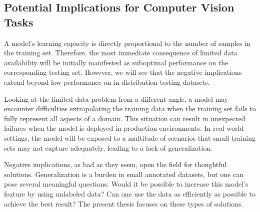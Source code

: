 \subsection{Potential Implications for Computer Vision Tasks}
A model's learning capacity is directly proportional to the number of samples in the training set. Therefore, the most immediate consequence of limited data availability will be initially manifested as suboptimal performance on the corresponding testing set. However, we will see that the negative implications extend beyond low performance on in-distribution testing datasets.

Looking at the limited data problem from a different angle, a model may encounter difficulties extrapolating the training data when the training set fails to fully represent all aspects of a domain. This situation can result in unexpected failures when the model is deployed in production environments. In real-world settings, the model will be exposed to a multitude of scenarios that small training sets may not capture adequately, leading to a lack of generalization.

Negative implications, as bad as they seem, open the field for thoughtful solutions. Generalization is a burden in small annotated datasets, but one can pose several meaningful questions: Would it be possible to increase this model's feature by using unlabeled data? Can one use the data as efficiently as possible to achieve the best result? The present thesis focuses on these types of solutions.